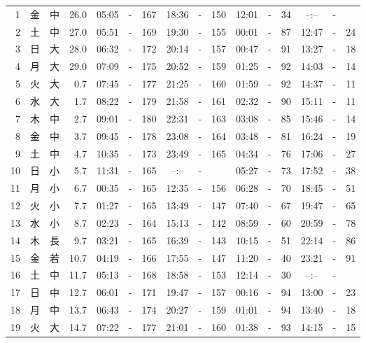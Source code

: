 \documentclass[12pt.a4j]{jsarticle}
\begin{document}
\begin{center}
\begin{table}[ht]
\begin{tabular}{|rc|cr|ccrccr|ccrccr|}
 \hline
 1 & 金 & 中 & 26.0 &  05:05 &-& 167  &  18:36 &-& 150  &   12:01 &-&  34  &   --:-- &-&     \\
 2 & 土 & 中 & 27.0 &  05:51 &-& 169  &  19:30 &-& 155  &   00:01 &-&  87  &   12:47 &-&  24  \\
 3 & 日 & 大 & 28.0 &  06:32 &-& 172  &  20:14 &-& 157  &   00:47 &-&  91  &   13:27 &-&  18  \\
 4 & 月 & 大 & 29.0 &  07:09 &-& 175  &  20:52 &-& 159  &   01:25 &-&  92  &   14:03 &-&  14  \\
 5 & 火 & 大 &  0.7 &  07:45 &-& 177  &  21:25 &-& 160  &   01:59 &-&  92  &   14:37 &-&  11  \\
 6 & 水 & 大 &  1.7 &  08:22 &-& 179  &  21:58 &-& 161  &   02:32 &-&  90  &   15:11 &-&  11  \\
 7 & 木 & 中 &  2.7 &  09:01 &-& 180  &  22:31 &-& 163  &   03:08 &-&  85  &   15:46 &-&  14  \\
 8 & 金 & 中 &  3.7 &  09:45 &-& 178  &  23:08 &-& 164  &   03:48 &-&  81  &   16:24 &-&  19  \\
 9 & 土 & 中 &  4.7 &  10:35 &-& 173  &  23:49 &-& 165  &   04:34 &-&  76  &   17:06 &-&  27  \\
10 & 日 & 小 &  5.7 &  11:31 &-& 165  &  --:-- &-&     &   05:27 &-&  73  &   17:52 &-&  38  \\
11 & 月 & 小 &  6.7 &  00:35 &-& 165  &  12:35 &-& 156  &   06:28 &-&  70  &   18:45 &-&  51  \\
12 & 火 & 小 &  7.7 &  01:27 &-& 165  &  13:49 &-& 147  &   07:40 &-&  67  &   19:47 &-&  65  \\
13 & 水 & 小 &  8.7 &  02:23 &-& 164  &  15:13 &-& 142  &   08:59 &-&  60  &   20:59 &-&  78  \\
14 & 木 & 長 &  9.7 &  03:21 &-& 165  &  16:39 &-& 143  &   10:15 &-&  51  &   22:14 &-&  86  \\
15 & 金 & 若 & 10.7 &  04:19 &-& 166  &  17:55 &-& 147  &   11:20 &-&  40  &   23:21 &-&  91  \\
16 & 土 & 中 & 11.7 &  05:13 &-& 168  &  18:58 &-& 153  &   12:14 &-&  30  &   --:-- &-&     \\
17 & 日 & 中 & 12.7 &  06:01 &-& 171  &  19:47 &-& 157  &   00:16 &-&  94  &   13:00 &-&  23  \\
18 & 月 & 中 & 13.7 &  06:43 &-& 174  &  20:27 &-& 159  &   01:01 &-&  94  &   13:40 &-&  18  \\
19 & 火 & 大 & 14.7 &  07:22 &-& 177  &  21:01 &-& 160  &   01:38 &-&  93  &   14:15 &-&  15  \\

\end{tabular}
\end{table}
\end{center}
\end{document}

